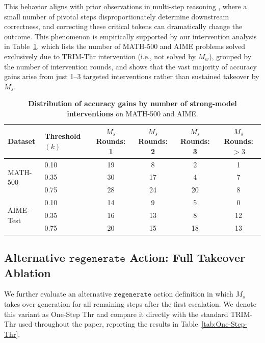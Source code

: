 \documentclass{article}
\theoremstyle{plain}
\theoremstyle{definition}
\theoremstyle{remark}
\newcommand{\regen}{\mathtt{regenerate}}
\begin{document}
This behavior aligns with prior observations in multi-step reasoning \citep{qwen80/20, fork}, where a small number of pivotal steps disproportionately determine downstream correctness, and correcting these critical tokens can dramatically change the outcome. This phenomenon is empirically supported by our intervention analysis in Table~\ref{tab:exclusive_trim_thr_rounds}, which lists the number of MATH-500 and AIME problems solved exclusively due to TRIM-Thr intervention (i.e., not solved by $M_w$), grouped by the number of intervention rounds, and shows that the vast majority of accuracy gains arise from just 1–3 targeted interventions rather than sustained takeover by $M_s$.
\begin{table}[t]
\caption{\footnotesize \textbf{Distribution of accuracy gains by number of strong-model interventions} on MATH-500 and AIME.}
\label{tab:exclusive_trim_thr_rounds}
\centering
\small
\setlength{\tabcolsep}{6pt}
\begin{tabular}{llcccc}
\toprule
Dataset & Threshold $(k)$
& $M_s$ Rounds: 1
& $M_s$ Rounds: 2
& $M_s$ Rounds: 3
& $M_s$ Rounds: $>3$ \\
\midrule
\multirow{3}{*}{MATH-500}
& 0.10 & 19 & 8  & 2  & 1 \\
& 0.35 & 30 & 17 & 4  & 7 \\
& 0.75 & 28 & 24 & 20 & 8 \\
\midrule
\multirow{3}{*}{AIME-Test}
& 0.10 & 14 & 9  & 5  & 0  \\
& 0.35 & 16 & 13 & 8  & 12 \\
& 0.75 & 20 & 15 & 18 & 13 \\
\bottomrule
\end{tabular}
\end{table}

\subsection{Alternative $\regen$ Action: Full Takeover Ablation}
We further evaluate an alternative $\regen$ action definition in which $M_s$ takes over generation for all remaining steps after the first escalation. We denote this variant as One-Step Thr and compare it directly with the standard TRIM-Thr used throughout the paper, reporting the results in Table~\ref{tab:One-Step-Thr}.
\end{document}
